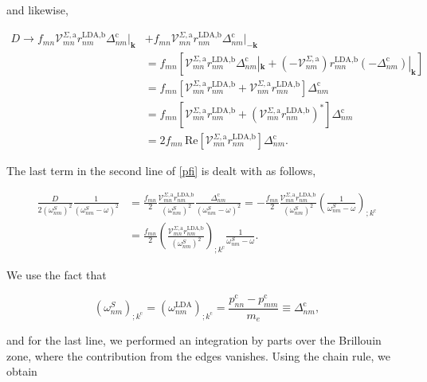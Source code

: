and likewise,

\begin{align}\label{dt}
D \rightarrow f_{mn}\mathcal{V}^{\Sigma,\text{a}}_{mn}r^{\text{LDA,b}}_{nm}\Delta^{\text{c}}_{nm}|_{\mathbf{k}} 
&+ f_{mn}\mathcal{V}^{\Sigma,\text{a}}_{mn}r^{\text{LDA,b}}_{nm}\Delta^{\text{c}}_{nm}|_{-\mathbf{k}}\nonumber\\
&= f_{mn}\left[\mathcal{V}^{\Sigma,\text{a}}_{mn}r^{\text{LDA,b}}_{nm}\Delta^{\text{c}}_{nm}|_{\mathbf{k}} + \left(-\mathcal{V}^{\Sigma,\text{a}}_{nm}\right)r^{\text{LDA,b}}_{mn}\left(-\Delta^{\text{c}}_{nm}\right)|_{\mathbf{k}}\right]\nonumber\\
&= f_{mn}\left[\mathcal{V}^{\Sigma,\text{a}}_{mn}r^{\text{LDA,b}}_{nm} + \mathcal{V}^{\Sigma,\text{a}}_{nm}r^{\text{LDA,b}}_{mn}\right]\Delta^{\text{c}}_{nm}\nonumber\\
&= f_{mn}\left[\mathcal{V}^{\Sigma,\text{a}}_{mn}r^{\text{LDA,b}}_{nm} + \left(\mathcal{V}^{\Sigma,\text{a}}_{mn}r^{\text{LDA,b}}_{nm}\right)^*\right]\Delta^{\text{c}}_{nm}\nonumber\\
&= 2f_{mn}\,\mathrm{Re}\left[\mathcal{V}^{\Sigma,\text{a}}_{mn}r^{\text{LDA,b}}_{nm}\right]\Delta^{\text{c}}_{nm}.
\end{align}

The last term in the second line of \eqref{pfi} is dealt with as follows,

\begin{align}\label{dresn}
\frac{D}{2(\omega^S_{nm})^2}\frac{1}{(\omega^S_{nm}-\omega)^2} 
&= \frac{f_{mn}}{2}\frac{\mathcal{V}^{\Sigma,\text{a}}_{mn}r^{\text{LDA,b}}_{nm}}{(\omega^S_{nm})^2}\frac{\Delta^{\text{c}}_{nm}}{(\omega^S_{nm}-\omega)^2} = -\frac{f_{mn}}{2}\frac{\mathcal{V}^{\Sigma,\text{a}}_{mn}r^{\text{LDA,b}}_{nm}}{(\omega^S_{nm})^2}\left(\frac{1}{\omega^S_{nm}-\omega}\right)_{;k^{\text{c}}}\nonumber\\
&= \frac{f_{mn}}{2}\left(\frac{\mathcal{V}^{\Sigma,\text{a}}_{mn}r^{\text{LDA,b}}_{nm}}{(\omega^S_{nm})^2}\right)_{;k^{\text{c}}}\frac{1}{\omega^S_{nm}-\omega}.
\end{align} 

We use the fact that

\begin{equation}\label{wk}
(\omega^S_{nm})_{;k^{\text{c}}}=(\omega^\text{LDA}_{nm})_{;k^{\text{c}}} = \frac{p_{nn}^{\text{c}}-p_{mm}^{\text{c}}}{m_{e}} \equiv \Delta_{nm}^{\text{c}},
\end{equation}

and for the last line, we performed an integration by parts over the Brillouin zone, where the contribution from the edges vanishes. Using the chain rule, we obtain

